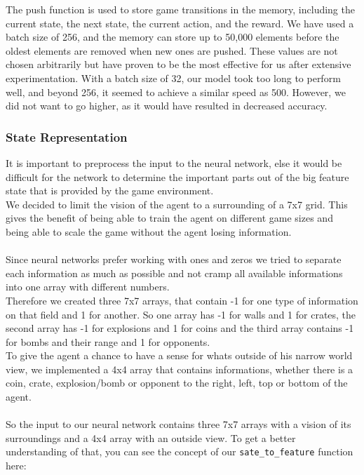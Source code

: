 The push function is used to store game transitions in the memory, including the current state, the next state, the current action, and the 
reward. We have used a batch size of 256, and the memory can store up to 50,000 elements before the oldest elements 
are removed when new ones are pushed. These values are not chosen arbitrarily but have proven to be the most effective for us 
after extensive experimentation. With a batch size of 32, our model took too long to perform well, and beyond 256, it seemed to achieve a 
similar speed as 500. However, we did not want to go higher, as it would have resulted in decreased accuracy.

\subsubsection{State Representation} \label{InFeatures}

It is important to preprocess the input to the neural network, else it would be difficult for the network to determine the important parts out of the big feature state that is provided by the game environment.\\
We decided to limit the vision of the agent to a surrounding of a 7x7 grid. This gives the benefit of being able to train the agent on different game sizes and being able to scale the game without the agent losing information.\\ \\
Since neural networks prefer working with ones and zeros we tried to separate each information as much as possible and not cramp all available informations into one array with different numbers.\\
Therefore we created three 7x7 arrays, that contain -1 for one type of information on that field and 1 for another. So one array has -1 for walls and 1 for crates, the second array has -1 for explosions and 1 for coins and the third array contains -1 for bombs and their range and 1 for opponents.\\
To give the agent a chance to have a sense for whats outside of his narrow world view, we implemented a 4x4 array that contains informations, whether there is a coin, crate, explosion/bomb or opponent to the right, left, top or bottom of the agent.\\ \\
So the input to our neural network contains three 7x7 arrays with a vision of its surroundings and a 4x4 array with an outside view.
To get a better understanding of that, you can see the concept of our \verb|sate_to_feature| function here:

